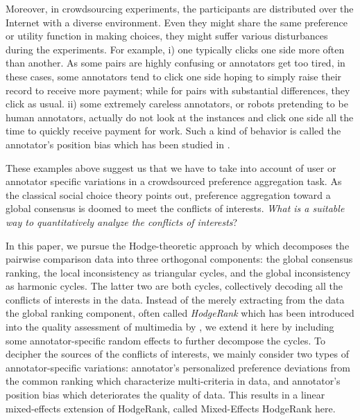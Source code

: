 \documentclass[10pt,journal,cspaper,compsoc]{IEEEtran}
\begin{document}
Moreover, in crowdsourcing experiments, the participants are distributed over the Internet with a diverse environment. Even they might share the same preference or utility function in making choices, they might suffer various disturbances during the experiments. For example, i) one typically clicks one side more often than another. As some pairs are highly confusing or annotators get too tired, in these cases, some annotators tend to click one side hoping to simply raise their record to receive more payment; while for pairs with substantial differences, they click as usual. ii) some extremely careless annotators, or robots pretending to be human annotators, actually do not look at the instances and click one side all the time to quickly receive payment for work. Such a kind of behavior is called the annotator's position bias which has been studied in \cite{day1969position}.

These examples above suggest us that we have to take into account of user or annotator specific variations in a crowdsourced preference aggregation task.
As the classical social choice theory \cite{Arrow51} points out, preference aggregation toward a global consensus is doomed to meet the conflicts of interests. \emph{What is a suitable way to quantitatively analyze the conflicts of interests}?

In this paper, we pursue the Hodge-theoretic approach by \cite{Hodge} which decomposes the pairwise comparison data into three orthogonal components: the global consensus ranking, the local inconsistency as triangular cycles, and the global inconsistency as harmonic cycles. The latter two are both cycles, collectively decoding all the conflicts of interests in the data. Instead of the merely extracting from the data the global ranking component, often called \emph{HodgeRank} which has been introduced into the quality assessment of multimedia by \cite{tmm12}, we extend it here by including some annotator-specific random effects to further decompose the cycles. To decipher the sources of the conflicts of interests, we mainly consider two types of annotator-specific variations: annotator's personalized preference deviations from the common ranking which characterize multi-criteria in data, and annotator's position bias which deteriorates the quality of data. This results in a linear mixed-effects extension of HodgeRank, called Mixed-Effects HodgeRank here.
\end{document}
